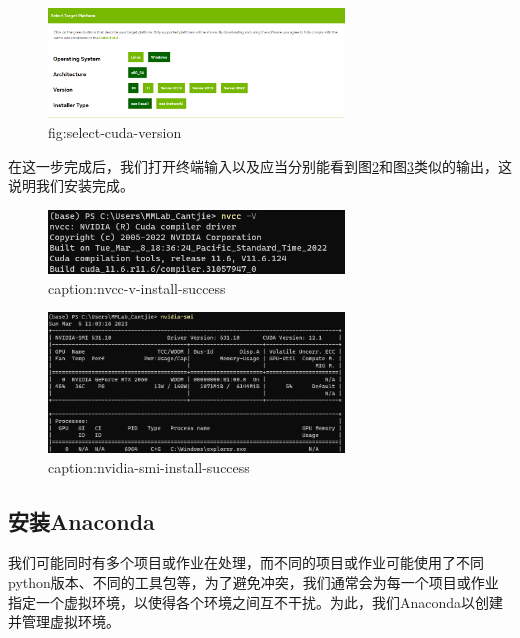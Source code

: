 \begin{figure}[htbp]
	\centering
	\includegraphics[width=0.7\textwidth]{figures/select-cuda-version.png}
	\caption{fig:select-cuda-version}
	\label{fig:select-cuda-version}
\end{figure}

在这一步完成后，我们打开终端输入以及应当分别能看到图\ref{fig:nvcc-v-install-success}和图\ref{fig:nvidia-smi-install-success}类似的输出，这说明我们安装完成。

\begin{figure}[htbp]
	\centering
	\includegraphics[width=0.7\textwidth]{figures/nvcc-v-install-success.png}
	\caption{caption:nvcc-v-install-success}
	\label{fig:nvcc-v-install-success}
\end{figure}

\begin{figure}[htbp]
	\centering
	\includegraphics[width=0.7\textwidth]{figures/nvidia-smi-install-success.png}
	\caption{caption:nvidia-smi-install-success}
	\label{fig:nvidia-smi-install-success}
\end{figure}

\subsection{安装Anaconda}

我们可能同时有多个项目或作业在处理，而不同的项目或作业可能使用了不同python版本、不同的工具包等，为了避免冲突，我们通常会为每一个项目或作业指定一个虚拟环境，以使得各个环境之间互不干扰。为此，我们Anaconda以创建并管理虚拟环境。

